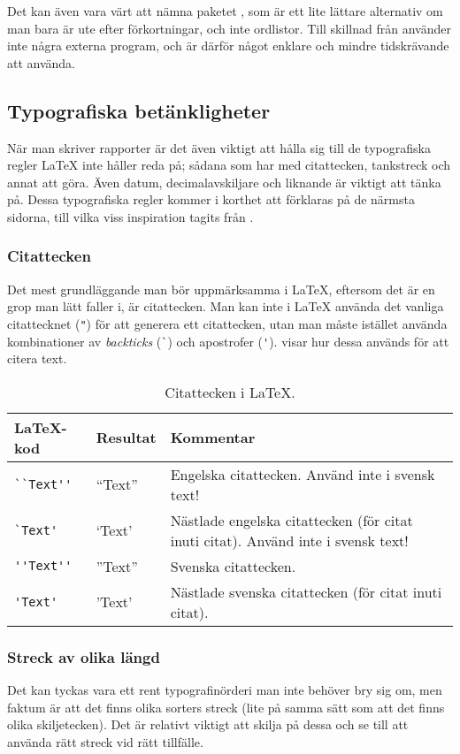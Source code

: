 \documentclass[lang=sv,ptsize=10pt,font=none,nomath,titles=bf,../../a4.tex]{subfiles}
\begin{document}
Det kan även vara värt att nämna paketet \label{sec:2:acro}
\parencite{Niederberger13}, som är ett lite lättare alternativ om man
bara är ute efter förkortningar, och inte ordlistor. Till skillnad
från  använder  inte några externa program,
och är därför något enklare och mindre tidskrävande att använda.

\subsection{Typografiska betänkligheter}
När man skriver rapporter är det även viktigt att hålla sig till de
typografiska regler \LaTeX{} inte håller reda på; sådana som har med
citattecken, tankstreck och annat att göra. Även datum, decimalavskiljare
och liknande är viktigt att tänka på. Dessa typografiska regler kommer i
korthet att förklaras på de närmsta sidorna, till vilka viss inspiration 
tagits från \textcite{Schultz05}.

\subsubsection{Citattecken}
Det mest grundläggande man bör uppmärksamma i \LaTeX{}, eftersom det är en
grop man lätt faller i, är citattecken. Man kan inte i \LaTeX{} använda
det vanliga citattecknet (\verb|"|) för att generera ett citattecken, utan
man måste istället använda kombinationer av \emph{backticks} (\verb|`|)
och apostrofer (\verb|'|).  visar hur dessa används
för att citera text.

\begin{table}[tbp]
	\centering 
	\caption{Citattecken i \LaTeX.}
	\label{tab:citat}
	\begin{tabular}{l l p{}}
		\toprule 
		\LaTeX-kod & Resultat & Kommentar \\ 
		\midrule 
		\verb|``Text''| & “Text” & Engelska citattecken. Använd inte i
		svensk text! \\
		\verb|`Text'| & ‘Text’ & Nästlade engelska citattecken (för citat
		inuti citat). Använd inte i svensk text! \\ 
		\verb|''Text''| & ”Text” & Svenska citattecken. \\
		\verb|'Text'| & ’Text’ & Nästlade svenska citattecken (för citat
		inuti citat). \\
		\bottomrule 
	\end{tabular}
\end{table}

\subsubsection{Streck av olika längd}
Det kan tyckas vara ett rent typografinörderi man inte behöver bry sig om,
men faktum är att det finns olika sorters streck (lite på samma sätt som
att det finns olika skiljetecken). Det är relativt viktigt att skilja på
dessa och se till att använda rätt streck vid rätt tillfälle.
\end{document}

